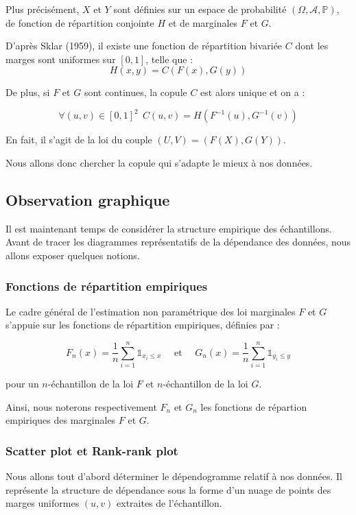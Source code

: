 Plus précisément, $X$ et $Y$  sont définies sur un espace de probabilité $(\Omega,\mathcal{A},\mathbb{P})$, de fonction de répartition conjointe $H$ et de marginales $F$ et $G$.

D'après Sklar (1959), il existe une fonction de répartition bivariée $C$ dont les marges sont uniformes sur $[0,1]$, telle que :
$$
H(x,y) = C(F(x),G(y))
$$

De plus, si $F$ et $G$ sont continues, la copule $C$ est alors unique et on a :

$$
\forall (u,v) \in [0,1]^2 ~~ C(u,v) = H(F^{-1}(u),G^{-1}(v))
$$

En fait, il s'agit de la loi du couple $(U,V) = (F(X),G(Y))$.

Nous allons donc chercher la copule qui s’adapte le mieux à nos données.




\subsection{Observation graphique}

Il est maintenant temps de considérer la structure empirique des échantillons. Avant de tracer les diagrammes représentatifs de 
la dépendance des données, nous allons exposer quelques notions.


\subsubsection{Fonctions de répartition empiriques}

Le cadre général de l’estimation non paramétrique des loi marginales $F$ et $G$ s’appuie sur les fonctions de répartition empiriques, définies par :

$$
F_n(x) = \frac{1}{n} \sum_{i=1}^n \mathbb{1}_{x_i \leq x}
\text{~~~~et~~~~}
G_n(x) = \frac{1}{n} \sum_{i=1}^n \mathbb{1}_{y_i \leq y}
$$

pour un $n$-échantillon de la loi $F$ et $n$-échantillon de la loi $G$.

Ainsi, nous noterons respectivement $F_n$ et $G_n$ les fonctions de répartion empiriques des marginales $F$ et $G$.


\subsubsection{Scatter plot et Rank-rank plot}

Nous allons tout d'abord déterminer le dépendogramme relatif à nos données.
Il représente la structure de dépendance sous la forme d'un nuage de points des marges uniformes $(u,v)$ extraites de l'échantillon.

